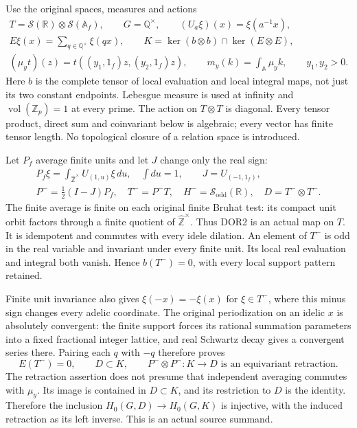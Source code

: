 Use the original spaces, measures and actions
\begin{equation}\tag{DOR1}
\begin{gathered}
T=\mathcal S(\mathbb R)\otimes\mathcal S(\mathbb A_f),\qquad
G=\mathbb Q^\times,\qquad (U_a\xi)(x)=\xi(a^{-1}x),\\
E\xi(x)=\sum_{q\in\mathbb Q^\times}\xi(qx),\qquad
K=\ker(b\otimes b)\cap\ker(E\otimes E),\\
(\mu_yt)(z)=t((y_1,1_f)z,(y_2,1_f)z),\qquad
m_y(k)=\int_{\mathbb A}\mu_yk,\qquad y_1,y_2>0.
\end{gathered}
\end{equation}
Here $b$ is the complete tensor of local evaluation and local integral
maps, not just its two constant endpoints. Lebesgue measure is used
at infinity and $\operatorname{vol}(\mathbb Z_p)=1$ at every prime.
The action on $T\otimes T$ is diagonal. Every tensor product, direct
sum and coinvariant below is algebraic; every vector has finite tensor
length. No topological closure of a relation space is introduced.

Let $P_f$ average finite units and let $J$ change only the real sign:
\begin{equation}\tag{DOR2}
\begin{gathered}
P_f\xi=\int_{\widehat{\mathbb Z}^{\times}}U_{(1,u)}\xi\,du,
\quad \int du=1,\qquad J=U_{(-1,1_f)},\\
P^-=\tfrac12(I-J)P_f,\quad
T^-=P^-T,\quad H^-=\mathcal S_{\mathrm{odd}}(\mathbb R),
\quad D=T^-\otimes T^-.
\end{gathered}
\end{equation}
The finite average is finite on each original finite Bruhat test:
its compact unit orbit factors through a finite quotient of
$\widehat{\mathbb Z}^{\times}$. Thus DOR2 is an actual map on $T$.
It is idempotent and commutes with every idele dilation. An element
of $T^-$ is odd in the real variable and invariant under every finite
unit. Its local real evaluation and integral both vanish. Hence
$b(T^-)=0$, with every local support pattern retained.

Finite unit invariance also gives $\xi(-x)=-\xi(x)$ for $\xi\in T^-$,
where this minus sign changes every adelic coordinate. The original
periodization on an idelic $x$ is absolutely convergent: the finite
support forces its rational summation parameters into a fixed
fractional integer lattice, and real Schwartz decay gives a convergent
series there. Pairing each $q$ with $-q$ therefore proves
\begin{equation}\tag{DOR3}
E(T^-)=0,\qquad D\subset K,\qquad
P^-\otimes P^-:K\longrightarrow D\text{ is an equivariant retraction}.
\end{equation}
The retraction assertion does not presume that independent averaging
commutes with $\mu_y$. Its image is contained in $D\subset K$, and
its restriction to $D$ is the identity. Therefore the inclusion
$H_0(G,D)\to H_0(G,K)$ is injective, with the induced retraction as
its left inverse. This is an actual source summand.

